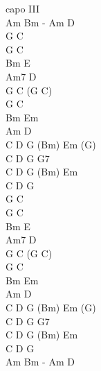 \begin{chord}
capo III\\
Am Bm - Am D\\
G C\\
G C\\
Bm E\\
Am7 D\\

G C (G C)\\
G C\\
Bm Em\\
Am D\\

C D G (Bm) Em (G)\\
C D G G7\\
C D G (Bm) Em\\
C D G\\

G C\\
G C\\
Bm E\\
Am7 D\\

G C (G C)\\
G C\\
Bm Em\\
Am D\\

C D G (Bm) Em (G)\\
C D G G7\\
C D G (Bm) Em\\
C D G\\
Am Bm - Am D\\
\end{chord}
